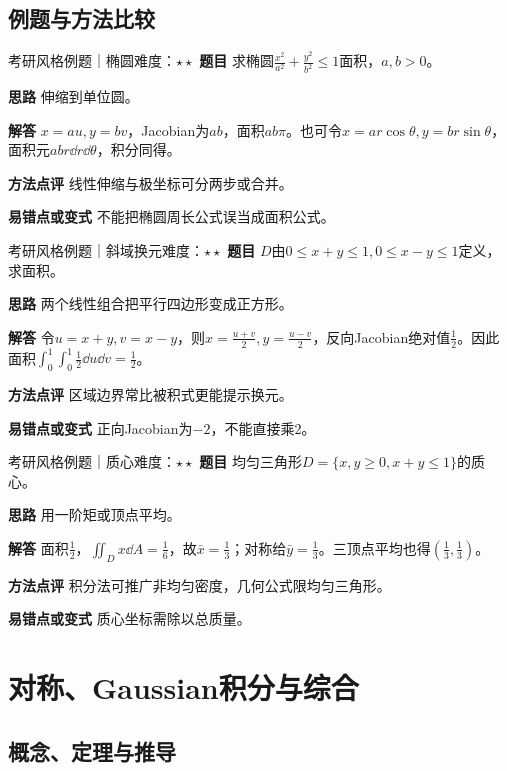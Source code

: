\subsection{例题与方法比较}
\begin{example}{考研风格例题｜椭圆}{难度：$\star\star$}
\label{ex:7:10}\textbf{题目} 求椭圆$\frac{x^2}{a^2}+\frac{y^2}{b^2}\le1$面积，$a,b>0$。\par
\textbf{思路} 伸缩到单位圆。\par
\textbf{解答} $x=au,y=bv$，Jacobian为$ab$，面积$ab\pi$。也可令$x=ar\cos\theta,y=br\sin\theta$，面积元$abr\dd r\dd\theta$，积分同得。\par
\textbf{方法点评} 线性伸缩与极坐标可分两步或合并。\par
\textbf{易错点或变式} 不能把椭圆周长公式误当成面积公式。
\end{example}
\begin{example}{考研风格例题｜斜域换元}{难度：$\star\star$}
\label{ex:7:11}\textbf{题目} $D$由$0\le x+y\le1,0\le x-y\le1$定义，求面积。\par
\textbf{思路} 两个线性组合把平行四边形变成正方形。\par
\textbf{解答} 令$u=x+y,v=x-y$，则$x=\frac{u+v}{2},y=\frac{u-v}{2}$，反向Jacobian绝对值$\frac{1}{2}$。因此面积$\int_0^1\int_0^1\frac12\dd u\dd v=\frac{1}{2}$。\par
\textbf{方法点评} 区域边界常比被积式更能提示换元。\par
\textbf{易错点或变式} 正向Jacobian为$-2$，不能直接乘2。
\end{example}
\begin{example}{考研风格例题｜质心}{难度：$\star\star$}
\label{ex:7:12}\textbf{题目} 均匀三角形$D=\{x,y\ge0,x+y\le1\}$的质心。\par
\textbf{思路} 用一阶矩或顶点平均。\par
\textbf{解答} 面积$\frac{1}{2}$，$\iint_Dx\dd A=\frac{1}{6}$，故$\bar x=\frac{1}{3}$；对称给$\bar y=\frac{1}{3}$。三顶点平均也得$(\frac{1}{3},\frac{1}{3})$。\par
\textbf{方法点评} 积分法可推广非均匀密度，几何公式限均匀三角形。\par
\textbf{易错点或变式} 质心坐标需除以总质量。
\end{example}
\section{对称、Gaussian积分与综合}\label{sec:7:5}
\subsection{概念、定理与推导}

